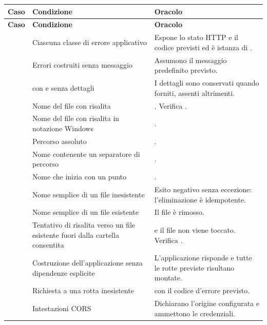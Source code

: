 \begin{longtable}{@{}l L{5.0cm} L{7.4cm}@{}}
\toprule
\textbf{Caso} & \textbf{Condizione} & \textbf{Oracolo} \\
\midrule
\endfirsthead
\toprule
\textbf{Caso} & \textbf{Condizione} & \textbf{Oracolo} \\
\midrule
\endhead
\bottomrule
\endlastfoot

 & Ciascuna classe di errore applicativo &
Espone lo stato HTTP e il codice previsti ed è istanza di . \\

 & Errori costruiti senza messaggio &
Assumono il messaggio predefinito previsto. \\

 &  con e senza dettagli &
I dettagli sono conservati quando forniti, assenti altrimenti. \\

 & Nome del file con risalita  &
. Verifica . \\

 & Nome del file con risalita in notazione Windows &
. \\

 & Percorso assoluto & . \\
 & Nome contenente un separatore di percorso & . \\
 & Nome che inizia con un punto & . \\

 & Nome semplice di un file inesistente &
Esito negativo senza eccezione: l'eliminazione è idempotente. \\

 & Nome semplice di un file esistente &
Il file è rimosso. \\

 & Tentativo di risalita verso un file esistente fuori dalla
  cartella consentita &
 e il file non viene toccato. Verifica . \\

 & Costruzione dell'applicazione senza dipendenze esplicite &
L'applicazione risponde e tutte le rotte previste risultano montate. \\

 & Richiesta a una rotta inesistente &
 con il codice d'errore previsto. \\

 & Intestazioni CORS &
Dichiarano l'origine configurata e ammettono le credenziali. \\

\end{longtable}

